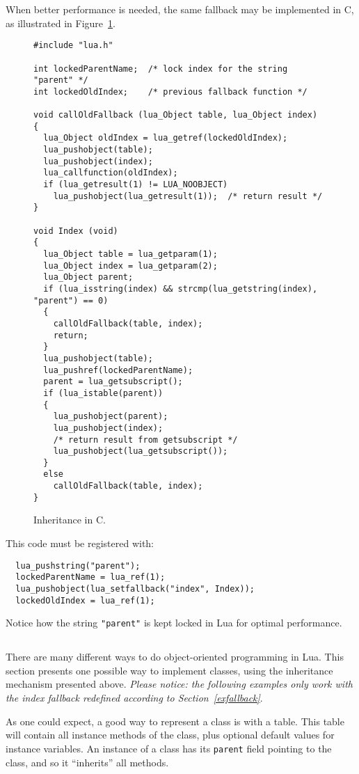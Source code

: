 When better performance is needed,
the same fallback may be implemented in C,
as illustrated in Figure~\ref{Cinher}.
\begin{figure}
\Line
\begin{verbatim}
#include "lua.h"

int lockedParentName;  /* lock index for the string "parent" */
int lockedOldIndex;    /* previous fallback function */

void callOldFallback (lua_Object table, lua_Object index)
{
  lua_Object oldIndex = lua_getref(lockedOldIndex);
  lua_pushobject(table);
  lua_pushobject(index);
  lua_callfunction(oldIndex);
  if (lua_getresult(1) != LUA_NOOBJECT)
    lua_pushobject(lua_getresult(1));  /* return result */
}

void Index (void)
{
  lua_Object table = lua_getparam(1);
  lua_Object index = lua_getparam(2);
  lua_Object parent;
  if (lua_isstring(index) && strcmp(lua_getstring(index), "parent") == 0)
  {
    callOldFallback(table, index);
    return;
  }
  lua_pushobject(table);
  lua_pushref(lockedParentName);
  parent = lua_getsubscript();
  if (lua_istable(parent))
  {
    lua_pushobject(parent);
    lua_pushobject(index);
    /* return result from getsubscript */
    lua_pushobject(lua_getsubscript());
  }
  else
    callOldFallback(table, index);
}
\end{verbatim}
\caption{Inheritance in C.\label{Cinher}}
\Line
\end{figure}
This code must be registered with:
\begin{verbatim}
  lua_pushstring("parent");
  lockedParentName = lua_ref(1);
  lua_pushobject(lua_setfallback("index", Index));
  lockedOldIndex = lua_ref(1);
\end{verbatim}
Notice how the string \verb'"parent"' is kept
locked in Lua for optimal performance.

\subsection{}
There are many different ways to do object-oriented programming in Lua.
This section presents one possible way to
implement classes,
using the inheritance mechanism presented above.
{\em Please notice: the following examples only work
with the index fallback redefined according to
Section~\ref{exfallback}}.

As one could expect, a good way to represent a class is
with a table.
This table will contain all instance methods of the class,
plus optional default values for instance variables.
An instance of a class has its \verb'parent' field pointing to
the class,
and so it ``inherits'' all methods.

